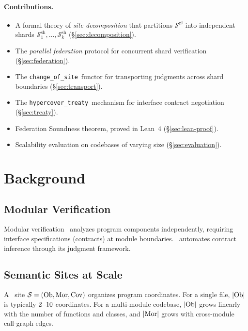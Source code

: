 \documentclass[11pt]{article}
\newcommand{\ShardSite}{\mathcal{S}^{\mathrm{sh}}}
\newcommand{\GlobalSite}{\mathcal{S}^{\mathrm{gl}}}
\newcommand{\ChangeOfSite}{\texttt{change\_of\_site}}
\newcommand{\HypercoverTreaty}{\texttt{hypercover\_treaty}}
\begin{document}
\paragraph{Contributions.}
\begin{itemize}[noitemsep]
  \item A formal theory of \emph{site decomposition} that partitions
        $\GlobalSite$ into independent shards $\ShardSite_1, \ldots,
        \ShardSite_k$ (§\ref{sec:decomposition}).
  \item The \emph{parallel federation} protocol for concurrent shard
        verification (§\ref{sec:federation}).
  \item The \ChangeOfSite\ functor for transporting judgments across
        shard boundaries (§\ref{sec:transport}).
  \item The \HypercoverTreaty\ mechanism for interface contract
        negotiation (§\ref{sec:treaty}).
  \item Federation Soundness theorem, proved in Lean~4
        (§\ref{sec:lean-proof}).
  \item Scalability evaluation on codebases of varying size
        (§\ref{sec:evaluation}).
\end{itemize}

\section{Background}\label{sec:background}

\subsection{Modular Verification}
Modular verification~\cite{Hoare1972,Leino2010} analyzes program
components independently, requiring interface specifications (contracts)
at module boundaries.  \JuGeo\ automates contract inference through
its judgment framework.

\subsection{Semantic Sites at Scale}
A \JuGeo\ site $\mathcal{S} = (\mathrm{Ob}, \mathrm{Mor}, \mathrm{Cov})$ organizes program
coordinates.  For a single file, $|\mathrm{Ob}|$ is typically
$2$--$10$ coordinates.  For a multi-module
codebase, $|\mathrm{Ob}|$ grows linearly with the number of functions and
classes, and $|\mathrm{Mor}|$ grows with cross-module call-graph edges.
\end{document}
